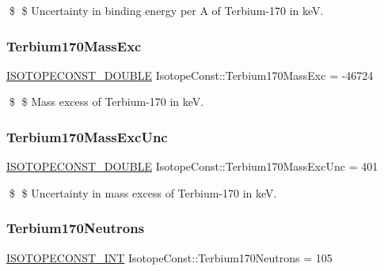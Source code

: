 \$ \$ Uncertainty in binding energy per A of Terbium-\/170 in keV. \mbox{\label{group___isotope_const-_terbium-_tb170_gadc5d038511bfd174f0525aa5934de6cb}} 
\subsubsection{\texorpdfstring{Terbium170\+Mass\+Exc}{Terbium170MassExc}}
{\footnotesize\ttfamily \mbox{\hyperlink{group___isotope_const-_macros_ga8f45a7272ce02c0b4c65c44636ed719a}{I\+S\+O\+T\+O\+P\+E\+C\+O\+N\+S\+T\+\_\+\+D\+O\+U\+B\+LE}} Isotope\+Const\+::\+Terbium170\+Mass\+Exc = -\/46724}

\$ \$ Mass excess of Terbium-\/170 in keV. \mbox{\label{group___isotope_const-_terbium-_tb170_gaf90e070aac6908dab670a94d13917d67}} 
\subsubsection{\texorpdfstring{Terbium170\+Mass\+Exc\+Unc}{Terbium170MassExcUnc}}
{\footnotesize\ttfamily \mbox{\hyperlink{group___isotope_const-_macros_ga8f45a7272ce02c0b4c65c44636ed719a}{I\+S\+O\+T\+O\+P\+E\+C\+O\+N\+S\+T\+\_\+\+D\+O\+U\+B\+LE}} Isotope\+Const\+::\+Terbium170\+Mass\+Exc\+Unc = 401}

\$ \$ Uncertainty in mass excess of Terbium-\/170 in keV. \mbox{\label{group___isotope_const-_terbium-_tb170_ga8d007a3ebad56eba4ee2b4f93ea122b0}} 
\subsubsection{\texorpdfstring{Terbium170\+Neutrons}{Terbium170Neutrons}}
{\footnotesize\ttfamily \mbox{\hyperlink{group___isotope_const-_macros_ga5f18360b3e99483a35c32d789e62621c}{I\+S\+O\+T\+O\+P\+E\+C\+O\+N\+S\+T\+\_\+\+I\+NT}} Isotope\+Const\+::\+Terbium170\+Neutrons = 105}

